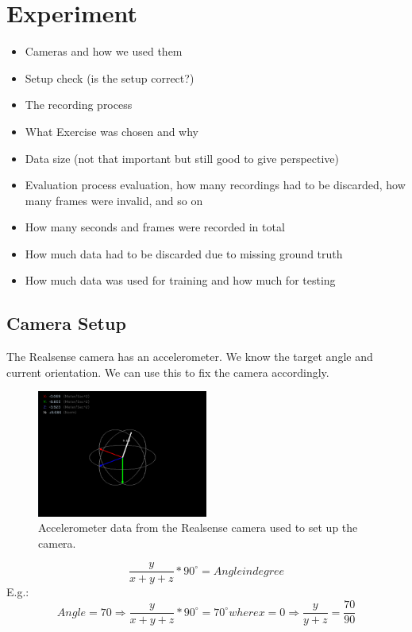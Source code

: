 \chapter{Experiment}
\label{sec:experiment}

\begin{itemize}
  \item Cameras and how we used them
  \item Setup check (is the setup correct?)
  \item The recording process
  \item What Exercise was chosen and why
  \item Data size (not that important but still good to give perspective)
  \item Evaluation process evaluation, how many recordings had to be discarded, how many frames were invalid, and so on
  \item How many seconds and frames were recorded in total
  \item How much data had to be discarded due to missing ground truth
  \item How much data was used for training and how much for testing
\end{itemize}

\section{Camera Setup}

The Realsense camera has an accelerometer. We know the target angle and current orientation. We can use this to fix the camera accordingly.

\begin{figure}
  \centering
  \includegraphics[width=0.5\textwidth]{figures/FESD/accelerometer.png}
  \caption{Accelerometer data from the Realsense camera used to set up the camera.}
  \label{fig:accellerometer}
\end{figure}

$$\dfrac{y}{x+y+z} * 90^{\circ} = Angle in degree $$
E.g.:
$$Angle = 70 \Rightarrow \dfrac{y}{x+y+z} * 90^{\circ} = 70^{\circ} where x = 0 \Rightarrow \dfrac{y}{y+z} = \dfrac{70}{90} $$